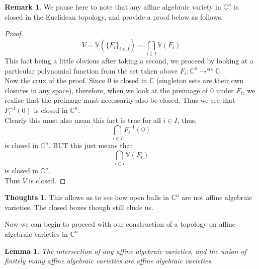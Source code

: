 \documentclass[12pt]{book}
\newtheorem{lemma}[theorem]{Lemma}
\theoremstyle{definition}
\newtheorem*{huh}{Thoughts}
\newtheorem*{remark}{Remark}
\begin{document}
\begin{remark}
    We pause here to note that any affine algebraic variety in $\mathbb{C}^n$ is closed in the Euclidean topology, and provide a proof below as follows.
    \begin{proof}
        $$V = \mathbb{V}(\{F_i\}_{i \in I}) = \bigcap_{i \in I} \mathbb{V}(F_i)$$
        This fact being a little obvious after taking a second, we proceed by looking at a particular polynomial function from the set taken above $F_i: \mathbb{C}^n \to^{cts} \mathbb{C}$.\\
        Now the crux of the proof. Since $0$ is closed in $\mathbb{C}$ (singleton sets are their own closures in any space), therefore, when we look at the preimage of $0$ under $F_i$, we realise that the preimage must necessarily also be closed. Thus we see that $F_i^{-1} (0)$ is closed in $\mathbb{C}^n$.\\
        Clearly this must also mean this fact is true for all $i \in I$, thus, 
        $$\bigcap_{i \in I} F_i^{-1} (0) $$
        is closed in $\mathbb{C}^n$. BUT this just means that  $$\bigcap_{i \in I} \mathbb{V}(F_i) $$
        is closed in $\mathbb{C}^n$.\\
        Thus $V$ is closed.
    \end{proof}
\end{remark}
\begin{huh}
    This allows us to see how open balls in $\mathbb{C}^n$ are not affine algebraic varieties. The closed boxes though still elude us.
\end{huh}
Now we can begin to proceed with our construction of a topology on affine algebraic varieties in $\mathbb{C}^n$
\begin{lemma}
    The intersection of any affine algebraic varieties, and the union of finitely many affine algebraic varieties are affine algebraic varieties.
\end{lemma}
\end{document}
